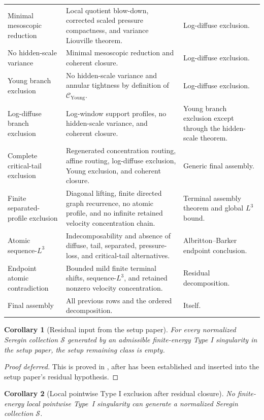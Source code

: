 \documentclass[11pt]{amsart}
\numberwithin{equation}{section}
\theoremstyle{plain}
\newtheorem{corollary}[corollary]{Corollary}
\theoremstyle{definition}
\theoremstyle{remark}
\newcommand{\calS}{\mathcal S}
\newcommand{\Cyoung}{\mathcal C_{\mathrm{Young}}}
\begin{document}
\begin{longtable}{@{}L{0.24\textwidth}L{0.45\textwidth}L{0.23\textwidth}@{}}
Minimal mesoscopic reduction &
Local quotient blow-down, corrected scaled pressure compactness, and variance
Liouville theorem. &
Log-diffuse exclusion.\\
No hidden-scale variance &
Minimal mesoscopic reduction and coherent closure. &
Log-diffuse exclusion.\\
Young branch exclusion &
No hidden-scale variance and annular tightness by definition of \(\Cyoung\). &
Log-diffuse exclusion.\\
Log-diffuse branch exclusion &
Log-window support profiles, no hidden-scale variance, and coherent closure. &
Young branch exclusion except through the hidden-scale theorem.\\
Complete critical-tail exclusion &
Regenerated concentration routing, affine routing, log-diffuse exclusion, Young
exclusion, and coherent closure. &
Generic final assembly.\\
Finite separated-profile exclusion &
Diagonal lifting, finite directed graph recurrence, no atomic profile, and no
infinite retained velocity concentration chain. &
Terminal assembly theorem and global \(L^3\) bound.\\
Atomic sequence-\(L^3\) &
Indecomposability and absence of diffuse, tail, separated, pressure-loss, and
critical-tail alternatives. &
Albritton--Barker endpoint conclusion.\\
Endpoint atomic contradiction &
Bounded mild finite terminal shifts, sequence-\(L^3\), and retained nonzero
velocity concentration. &
Residual decomposition.\\
Final assembly &
All previous rows and the ordered decomposition. &
Itself.\\
\hline
\end{longtable}

\begin{corollary}[Residual input from the setup paper]
\label{cor:paperI-residual-input}
For every normalized Seregin collection \(\calS\) generated by an
admissible finite-energy Type I singularity in the setup paper, the setup
remaining class is empty.
\end{corollary}

\begin{proof}[Proof deferred]
This is proved in , after
 has been established and inserted into the
setup paper's residual hypothesis.
\end{proof}

\begin{corollary}[Local pointwise Type I exclusion after residual closure]
\label{cor:typeI-exclusion-main}
No finite-energy local pointwise Type~I singularity can generate a normalized
Seregin collection \(\calS\).
\end{corollary}
\end{document}
